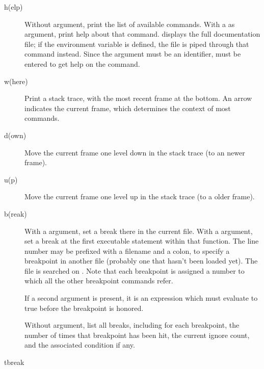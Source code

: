 \begin{description}

\item[h(elp) ]

Without argument, print the list of available commands.  With a
 as argument, print help about that command.   displays the full documentation file; if the environment variable
 is defined, the file is piped through that command
instead.  Since the  argument must be an identifier,
 must be entered to get help on the \samp{!} command.

\item[w(here)]

Print a stack trace, with the most recent frame at the bottom.  An
arrow indicates the current frame, which determines the context of
most commands.

\item[d(own)]

Move the current frame one level down in the stack trace
(to an newer frame).

\item[u(p)]

Move the current frame one level up in the stack trace
(to a older frame).

\item[b(reak) ]

With a  argument, set a break there in the current
file.  With a  argument, set a break at the first
executable statement within that function.
The line number may be prefixed with a filename and a colon,
to specify a breakpoint in another file (probably one that
hasn't been loaded yet).  The file is searched on .
Note that each breakpoint is assigned a number to which all the other
breakpoint commands refer.

If a second argument is present, it is an expression which must
evaluate to true before the breakpoint is honored.

Without argument, list all breaks, including for each breakpoint,
the number of times that breakpoint has been hit, the current
ignore count, and the associated condition if any.

\item[tbreak ]


\end{description}
